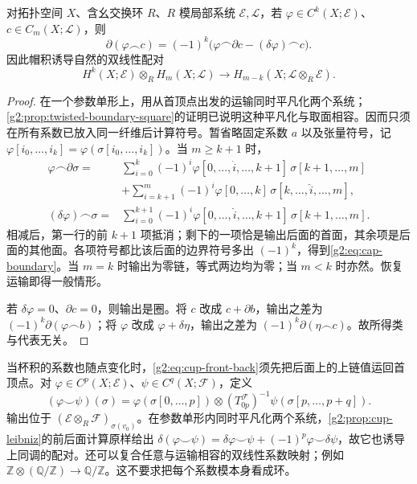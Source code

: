 \begin{proposition}\label{g2:prop:cap-boundary}
	对拓扑空间 \(X\)、含幺交换环 \(R\)、\(R\) 模局部系统 \(\mathcal E,\mathcal L\)，若 \(\varphi\in C^k(X;\mathcal E)\)、\(c\in C_m(X;\mathcal L)\)，则
	\begin{equation}\label{g2:eq:cap-boundary}
		\partial(\varphi\frown c)
		=(-1)^k\bigl(\varphi\frown\partial c-(\delta\varphi)\frown c\bigr).
	\end{equation}
	因此帽积诱导自然的双线性配对
	\[
		H^k(X;\mathcal E)\otimes_R H_m(X;\mathcal L)
		\longrightarrow H_{m-k}(X;\mathcal L\otimes_R\mathcal E).
	\]
\end{proposition}
\begin{proof}
	在一个参数单形上，用从首顶点出发的运输同时平凡化两个系统；\cref{g2:prop:twisted-boundary-square}的证明已说明这种平凡化与取面相容。因而只须在所有系数已放入同一纤维后计算符号。暂省略固定系数 \(a\) 以及张量符号，记 \(\varphi[i_0,\ldots,i_k]=\varphi(\sigma[i_0,\ldots,i_k])\)。当 \(m\ge k+1\) 时，
	\[
		\begin{aligned}
			\varphi\frown\partial\sigma
			={}&\sum_{i=0}^{k}(-1)^i\varphi[0,\ldots,\widehat i,\ldots,k+1]\,
			\sigma[k+1,\ldots,m]\\
			&+\sum_{i=k+1}^{m}(-1)^i\varphi[0,\ldots,k]\,
			\sigma[k,\ldots,\widehat i,\ldots,m],\\
			(\delta\varphi)\frown\sigma
			={}&\sum_{i=0}^{k+1}(-1)^i\varphi[0,\ldots,\widehat i,\ldots,k+1]\,
			\sigma[k+1,\ldots,m].
		\end{aligned}
	\]
	相减后，第一行的前 \(k+1\) 项抵消；剩下的一项恰是输出后面的首面，其余项是后面的其他面。各项符号都比该后面的边界符号多出 \((-1)^k\)，得到\eqref{g2:eq:cap-boundary}。当 \(m=k\) 时输出为零链，等式两边均为零；当 \(m<k\) 时亦然。恢复运输即得一般情形。

	若 \(\delta\varphi=0\)、\(\partial c=0\)，则输出是圈。将 \(c\) 改成 \(c+\partial b\)，输出之差为 \((-1)^k\partial(\varphi\frown b)\)；将 \(\varphi\) 改成 \(\varphi+\delta\eta\)，输出之差为 \((-1)^k\partial(\eta\frown c)\)。故所得类与代表无关。
\end{proof}

当杯积的系数也随点变化时，\eqref{g2:eq:cup-front-back}须先把后面上的上链值运回首顶点。对 \(\varphi\in C^p(X;\mathcal E)\)、\(\psi\in C^q(X;\mathcal F)\)，定义
\begin{equation}\label{g2:eq:local-cup-front-back}
	(\varphi\smile\psi)(\sigma)
	=\varphi(\sigma[0,\ldots,p])\otimes
	(T^{\mathcal F}_{0p})^{-1}\psi(\sigma[p,\ldots,p+q]).
\end{equation}
输出位于 \((\mathcal E\otimes_R\mathcal F)_{\sigma(v_0)}\)。在参数单形内同时平凡化两个系统，\cref{g2:prop:cup-leibniz}的前后面计算原样给出 \(\delta(\varphi\smile\psi)=\delta\varphi\smile\psi+(-1)^p\varphi\smile\delta\psi\)，故它也诱导上同调的配对。还可以复合任意与运输相容的双线性系数映射；例如 \(\mathbb Z\otimes(\mathbb Q/\mathbb Z)\to\mathbb Q/\mathbb Z\)。这不要求把每个系数模本身看成环。

